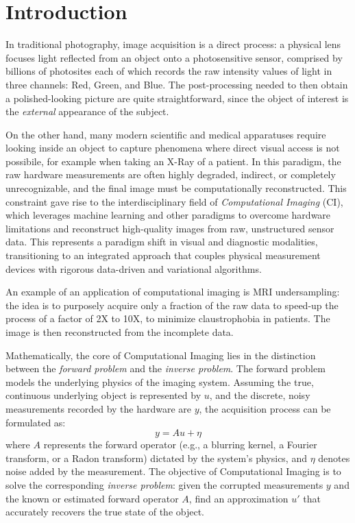\section{Introduction}

In traditional photography, image acquisition is a direct process: a physical lens focuses light reflected from an object onto a photosensitive sensor, comprised by billions of photosites each of which records the raw intensity values of light in three channels: Red, Green, and Blue. The post-processing needed to then obtain a polished-looking picture are quite straightforward, since the object of interest is the \textit{external} appearance of the subject.

On the other hand, many modern scientific and medical apparatuses require looking inside an object to capture phenomena where direct visual access is not possibile, for example when taking an X-Ray of a patient. In this paradigm, the raw hardware measurements are often highly degraded, indirect, or completely unrecognizable, and the final image must be computationally reconstructed. This constraint gave rise to the interdisciplinary field of \textit{Computational Imaging} (CI), which leverages machine learning and other paradigms to overcome hardware limitations and reconstruct high-quality images from raw, unstructured sensor data. This represents a paradigm shift in visual and diagnostic modalities, transitioning to an integrated approach that couples physical measurement devices with rigorous data-driven and variational algorithms.

An example of an application of computational imaging is MRI undersampling: the idea is to purposely acquire only a fraction of the raw data to speed-up the process of a factor of 2X to 10X, to minimize claustrophobia in patients. The image is then reconstructed from the incomplete data.

Mathematically, the core of Computational Imaging lies in the distinction between the \textit{forward problem} and the \textit{inverse problem}. The forward problem models the underlying physics of the imaging system. Assuming the true, continuous underlying object is represented by $u$, and the discrete, noisy measurements recorded by the hardware are $y$, the acquisition process can be formulated as:
\begin{equation}
    y = Au + \eta
\end{equation}
where $A$ represents the forward operator (e.g., a blurring kernel, a Fourier transform, or a Radon transform) dictated by the system's physics, and $\eta$ denotes noise added by the measurement. The objective of Computational Imaging is to solve the corresponding \textit{inverse problem}: given the corrupted measurements $y$ and the known or estimated forward operator $A$, find an approximation $u'$ that accurately recovers the true state of the object.

